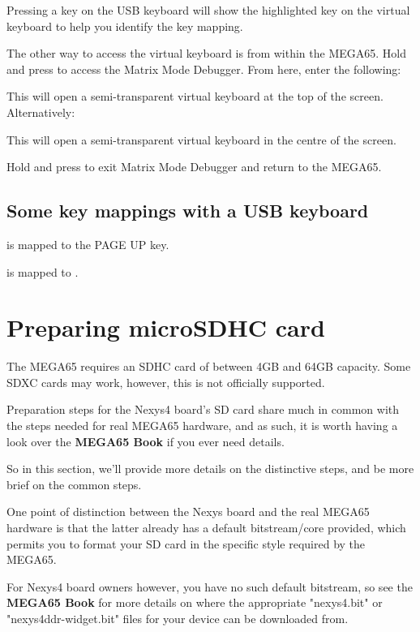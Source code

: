 Pressing a key on the USB keyboard will show the highlighted key on the virtual keyboard to help you identify the key mapping.

The other way to access the virtual keyboard is from within the MEGA65. Hold \megasymbolkey and press  to access the Matrix Mode Debugger. From here, enter the following:


This will open a semi-transparent virtual keyboard at the top of the screen. Alternatively:


This will open a semi-transparent virtual keyboard in the centre of the screen.

Hold \megasymbolkey and press  to exit Matrix Mode Debugger and return to the MEGA65.

\subsection{Some key mappings with a USB keyboard}

 is mapped to the PAGE UP key.

 is mapped to .

\newpage

\section{Preparing microSDHC card}

The MEGA65 requires an SDHC card of between 4GB and 64GB capacity.  Some SDXC cards may work, however, this is not officially supported.

Preparation steps for the Nexys4 board's SD card share much in common with the
steps needed for real MEGA65 hardware, and as such, it is worth having a look
over
\ifdefined\printmanual
the {\bf MEGA65 Book}
\else
{}
\fi
if you ever need details.

So in this section, we'll provide more details on the distinctive steps, and be more brief on the common steps.

One point of distinction between the Nexys board and the real MEGA65 hardware is that the latter already has a default bitstream/core provided, which permits you to format your SD card in the specific style required by the MEGA65.

For Nexys4 board owners however, you have no such default bitstream, so
see
the {\bf MEGA65 Book}
for more details on where the appropriate "nexys4.bit" or "nexys4ddr-widget.bit" files for your device can be downloaded from.

